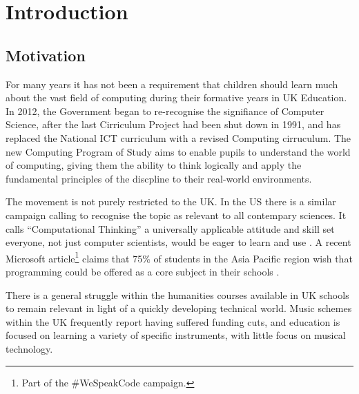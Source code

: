 \documentclass[11pt, abstracton, twoside, titlepage=true]{scrartcl}
\begin{document}
\thispagestyle{empty}
\tableofcontents
\newpage

\section{Introduction}
\thispagestyle{empty}

\subsection{Motivation}
For many years it has not been a requirement that children should learn much
about the vast field of computing during their formative years in UK 
Education. In 2012, the Government began to re-recognise the signifiance of 
Computer Science, after the last Cirriculum Project had been shut down in 1991, 
and has replaced the National ICT curriculum with a revised 
Computing cirruculum. The new Computing Program of Study \cite{DfE13} aims to 
enable pupils to understand the world of computing, giving them the ability to 
think logically and apply the fundamental principles of the discpline to their 
real-world environments.

The movement is not purely restricted to the UK. In the US there is a similar 
campaign calling to recognise the topic as relevant to all contempary 
sciences. It calls ``Computational Thinking'' a universally applicable 
attitude and skill set everyone, not just computer scientists, would be eager 
to learn and use \cite{Wing06}. A recent Microsoft article\footnote{Part of the 
\#WeSpeakCode campaign.} claims that 75\% of students in the Asia Pacific region
wish that programming could be offered as a core subject in their schools \cite{micro}.

There is a general struggle within the humanities courses available in UK schools 
to remain relevant in light of a quickly developing technical world. Music schemes 
within the UK frequently report having suffered funding cuts, and education is 
focused on learning a variety of specific instruments, with little focus on 
musical technology.
\end{document}
